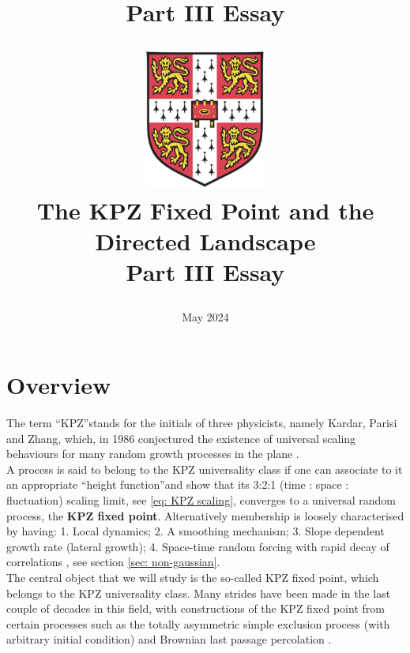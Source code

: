 \documentclass[12pt]{report}
\title{Part III Essay}
\theoremstyle{plain}
\begin{document}
\title{

{\includegraphics[width=0.3\textwidth]{images/Logo.png}}\\
{The KPZ Fixed Point and the Directed Landscape}\\
{Part III Essay}
}

\date{May 2024}

\maketitle

\tableofcontents

\chapter*{Overview}

\indent The term \textquotedblleft KPZ\textquotedblright stands for the initials of three physicists, namely Kardar, Parisi and Zhang, which, in 1986 conjectured the existence of universal scaling behaviours for many random growth processes in the plane \cite{kardar1986dynamic}.\\

A process is said to belong to the KPZ universality class if one can associate to it an appropriate \textquotedblleft height function\textquotedblright and show that its 3:2:1 (time : space : fluctuation) scaling limit, see \ref{eq: KPZ scaling}, converges to a universal random process, the \textbf{KPZ fixed point}. Alternatively membership is loosely characterised by having: 1. Local dynamics; 2.
A smoothing mechanism; 3. Slope dependent growth rate (lateral growth); 4. Space-time random forcing with rapid decay of correlations \cite{matetski2021kpz}, see section \ref{sec: non-gaussian}.\\

The central object that we will study is the so-called KPZ fixed point, which belongs to the KPZ universality class. Many strides have been made in the last couple of decades in this field, with constructions of the KPZ fixed point from certain processes such as the totally asymmetric simple exclusion process (with arbitrary initial condition) \cite{matetski2021kpz} and Brownian last passage percolation \cite{nica2020one}.\\
\end{document}
